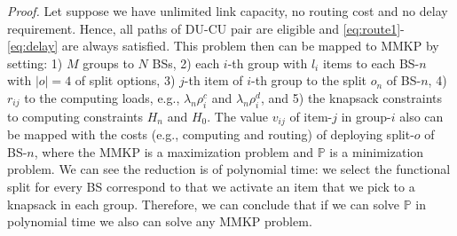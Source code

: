 \noindent
\textit{Proof.} Let suppose we have unlimited link capacity, no routing cost and no delay requirement. Hence, all paths of  DU-CU pair are eligible and \eqref{eq:route1}-\eqref{eq:delay} are always satisfied. This problem then can be mapped to MMKP by setting: 1) $M$ groups to $N$ BSs, 2) each $i$-th group with $l_i$ items to each BS-$n$ with $|o|=4 $ of split options, 3) $j$-th item of $i$-th group to the split $o_n$ of BS-$n$, 4) $r_{ij}$ to the  computing loads, e.g., $\lambda_{n}\rho_{i}^c$ and $\lambda_{n}\rho_{i}^d$, and 5) the knapsack constraints to computing constraints $H_n$ and $H_0$. The value $v_{ij}$ of item-$j$ in group-$i$ also can be mapped with the costs (e.g., computing and routing) of deploying split-$o$ of BS-$n$, where the MMKP is a maximization problem and $\mathbb{P}$ is a minimization problem.  We can see the reduction is of polynomial time: we select the functional split for every BS correspond to that we activate an item that we pick to a knapsack in each group. Therefore, we can conclude that if we can solve $\mathbb{P}$ in polynomial time we also can solve any MMKP problem. 

%
%
